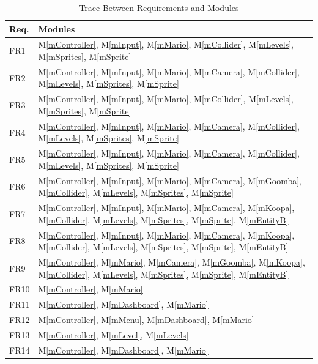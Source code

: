 \documentclass[12pt, titlepage]{article}
\newcommand{\mref}[1]{M\ref{#1}}
\begin{document}
\begin{table}[H]
\centering
\begin{tabular}{p{} p{}}
\toprule
\textbf{Req.} & \textbf{Modules}\\
\midrule
FR1 & \mref{mController}, \mref{mInput}, \mref{mMario}, \mref{mCollider}, \mref{mLevels}, \mref{mSprites}, \mref{mSprite}\\
FR2 & \mref{mController}, \mref{mInput}, \mref{mMario}, \mref{mCamera}, \mref{mCollider}, \mref{mLevels}, \mref{mSprites}, \mref{mSprite}\\
FR3 & \mref{mController}, \mref{mInput}, \mref{mMario}, \mref{mCollider}, \mref{mLevels}, \mref{mSprites}, \mref{mSprite}\\
FR4 & \mref{mController}, \mref{mInput}, \mref{mMario}, \mref{mCamera}, \mref{mCollider}, \mref{mLevels}, \mref{mSprites}, \mref{mSprite}\\
FR5 & \mref{mController}, \mref{mInput}, \mref{mMario}, \mref{mCamera}, \mref{mCollider}, \mref{mLevels}, \mref{mSprites}, \mref{mSprite}\\
FR6 & \mref{mController}, \mref{mInput}, \mref{mMario}, \mref{mCamera}, \mref{mGoomba}, \mref{mCollider}, \mref{mLevels}, \mref{mSprites}, \mref{mSprite}\\
FR7 & \mref{mController}, \mref{mInput}, \mref{mMario}, \mref{mCamera}, \mref{mKoopa}, \mref{mCollider}, \mref{mLevels}, \mref{mSprites}, \mref{mSprite}, \mref{mEntityB}\\
FR8 & \mref{mController}, \mref{mInput}, \mref{mMario}, \mref{mCamera}, \mref{mKoopa}, \mref{mCollider}, \mref{mLevels}, \mref{mSprites}, \mref{mSprite}, \mref{mEntityB}\\
FR9 & \mref{mController}, \mref{mMario}, \mref{mCamera}, \mref{mGoomba}, \mref{mKoopa}, \mref{mCollider}, \mref{mLevels}, \mref{mSprites}, \mref{mSprite}, \mref{mEntityB}\\
FR10 & \mref{mController}, \mref{mMario} \\
FR11 & \mref{mController}, \mref{mDashboard}, \mref{mMario}\\
FR12 & \mref{mController}, \mref{mMenu}, \mref{mDashboard}, \mref{mMario}\\
FR13 & \mref{mController}, \mref{mLevel}, \mref{mLevels}\\
FR14 & \mref{mController}, \mref{mDashboard}, \mref{mMario}\\

\bottomrule
\end{tabular}
\caption{Trace Between Requirements and Modules}
\label{TblRT}
\end{table}
\end{document}
